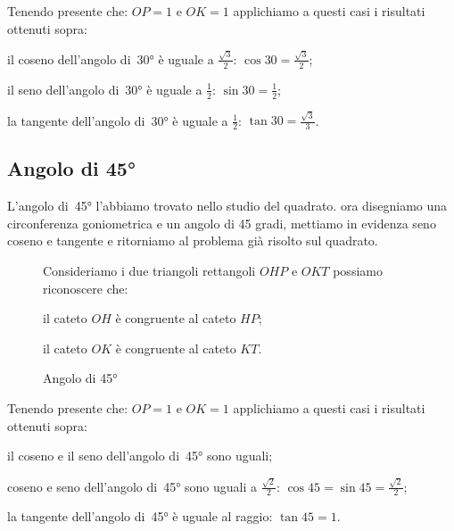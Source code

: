 Tenendo presente che: $OP=1$ e $OK=1$ applichiamo a questi casi i risultati 
ottenuti sopra:
\begin{itemize*}
 \item il coseno dell'angolo di~30° è uguale a $\frac{\sqrt{3}}{2}$: 
  $\cos 30 = \frac{\sqrt{3}}{2}$; 
 \item il seno dell'angolo di~30° è uguale a $\frac{1}{2}$: 
  $\sin 30 = \frac{1}{2}$; 
 \item la tangente dell'angolo di~30° è uguale a $\frac{1}{2}$: 
  $\tan 30 = \frac{\sqrt{3}}{3}$.
\end{itemize*}

\subsection{Angolo di 45°}

L'angolo di~45° l'abbiamo trovato nello studio del quadrato. ora 
disegniamo una circonferenza goniometrica e un angolo di 45 gradi, mettiamo in 
evidenza seno coseno e tangente e ritorniamo al problema già risolto sul 
quadrato.

 \begin{figure}[!h]
 \begin{minipage}{.45\textwidth}
  \begin{center}
\begin{inaccessibleblock}
    
    \caption{Angolo di 45°}
    \label{fig:trigo_angolo_45}
\end{inaccessibleblock}
  \end{center}
 \end{minipage}
 \begin{minipage}{.45\textwidth}
Consideriamo i due triangoli rettangoli $OHP$ e $OKT$ possiamo riconoscere che:
\begin{itemize*}
 \item il cateto $OH$ è congruente al cateto $HP$; 
 \item il cateto $OK$ è congruente al cateto $KT$.
\end{itemize*}
 \end{minipage}
\end{figure}
\vspace{-12pt}

Tenendo presente che: $OP=1$ e $OK=1$ applichiamo a questi casi i risultati 
ottenuti sopra:
\begin{itemize*}
 \item il coseno e il seno dell'angolo di~45° sono uguali;
 \item coseno e seno dell'angolo di~45° sono uguali a $\frac{\sqrt{2}}{2}$: 
  $\cos 45 = \sin 45 = \frac{\sqrt{2}}{2}$; 
 \item la tangente dell'angolo di~45° è uguale al raggio: 
  $\tan 45 = 1$.
\end{itemize*}

